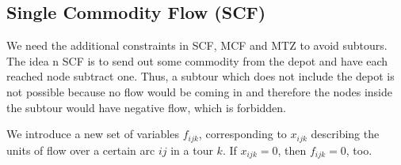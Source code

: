 \subsection{Single Commodity Flow (SCF)}

We need the additional constraints in SCF, MCF and MTZ to avoid subtours. The idea n SCF is
to send out some commodity from the depot and have each reached node subtract one. Thus, a 
subtour which does not include the depot is not possible because no flow would be coming in
and therefore the nodes inside the subtour would have negative flow, which is forbidden.

We introduce a new set of variables $f_{ijk}$, corresponding to $x_{ijk}$ describing the units
of flow over a certain arc $ij$ in a tour $k$. If $x_{ijk} = 0$, then $f_{ijk} = 0$, too.

